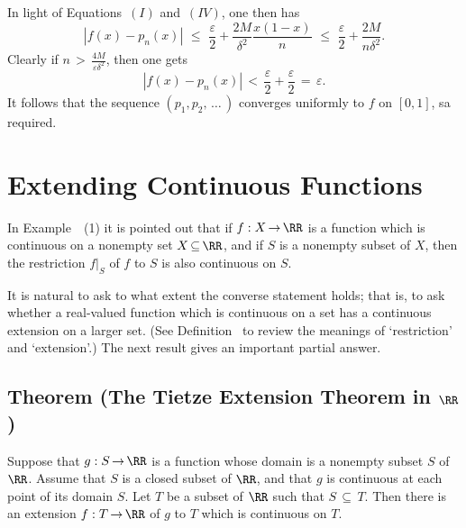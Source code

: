     In light of Equations~$(I)$ and~$(IV)$, one then has
        \begin{displaymath}
        |f(x) - p_{n}(x)|\,\,{\leq}\,\,\frac{{\varepsilon}}{2} + \frac{2M}{{\delta}^{2}}\frac{x(1-x)}{n}\,\,{\leq}\,\,\frac{{\varepsilon}}{2} + \frac{2M}{n{\delta}^{2}}.
        \end{displaymath}
    Clearly if $n\,>\,{\displaystyle \frac{4M}{{{\varepsilon}\delta}^{2}}}$, then one gets
        \begin{displaymath}
        |f(x) - p_{n}(x)|\,<\,\frac{{\varepsilon}}{2} + \frac{{\varepsilon}}{2} \,=\, {\varepsilon}.
        \end{displaymath}
    It follows that the sequence $(p_{1},p_{2},\,{\ldots}\,)$ converges uniformly to $f$ on $[0,1]$, sa required.



\V
\V


                \section{{\bf Extending Continuous Functions}}
                \label{SectF20}

\V

        In Example~~(1) it is pointed out that if $f:X \,{\rightarrow}\, {\RR}$ is a function which is continuous on a nonempty set $X \,{\subseteq}\, {\RR}$,
    and if $S$ is a nonempty subset of $X$, then the restriction $f|_{S}$ of $f$ to $S$ is also continuous on $S$.

        It is natural to ask to what extent the converse statement holds; that is,
    to ask whether a real-valued function which is continuous on a set has a continuous extension on a larger set.
    (See Definition~ to review the meanings of `restriction' and `extension'.)
    The next result gives an important partial answer.

\V 

            \subsection{\small{\bf Theorem} (The Tietze Extension Theorem in ${\RR}$)}
            \label{ThmF20.20}

\V

        Suppose that $g:S \,{\rightarrow}\, {\RR}$ is a function whose domain is a nonempty subset $S$ of ${\RR}$.
    Assume that $S$ is a closed subset of ${\RR}$, and that $g$ is continuous at each point of its domain $S$.
    Let $T$ be a subset of ${\RR}$ such that $S \,{\subseteq}\, T$.
    Then there is an extension $f:T \,{\rightarrow}\, {\RR}$ of $g$ to $T$ which is continuous on $T$.

